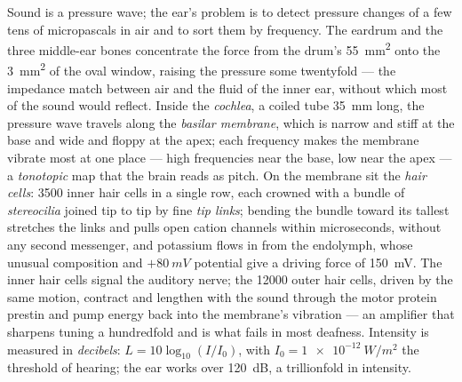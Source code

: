 \begin{definition}\label{def:b3:sensory-systems:cochlea}
Sound is a pressure wave; the ear's problem is to detect pressure
changes of a few tens of micropascals in air and to sort them by
frequency. The eardrum and the three middle-ear bones concentrate the
force from the drum's \qty{55}{mm^2} onto the \qty{3}{mm^2} of the oval
window, raising the pressure some twentyfold --- the impedance match
between air and the fluid of the inner ear, without which most of the
sound would reflect. Inside the \emph{cochlea}, a coiled tube
\qty{35}{mm} long, the pressure wave travels along the \emph{basilar
membrane}, which is narrow and stiff at the base and wide and floppy at
the apex; each frequency makes the membrane vibrate most at one place
--- high frequencies near the base, low near the apex --- a
\emph{tonotopic} map that the brain reads as pitch. On the membrane sit
the \emph{hair cells}: \num{3500} inner hair cells in a single row,
each crowned with a bundle of \emph{stereocilia} joined tip to tip by
fine \emph{tip links}; bending the bundle toward its tallest 
stretches the links and pulls open cation channels within microseconds,
without any second messenger, and potassium flows in from the
endolymph, whose unusual composition and $+\qty{80}{mV}$ potential give
a driving force of \qty{150}{mV}. The inner hair cells signal the
auditory nerve; the \num{12000} outer hair cells, driven by the same
motion, contract and lengthen with the sound through the motor protein
prestin and pump energy back into the membrane's vibration --- an
amplifier that sharpens tuning a hundredfold and is what fails in most
deafness. Intensity is measured in \emph{decibels}: $L = 10\log_{10}
(I/I_{0})$, with $I_{0} = \qty{1e-12}{W/m^2}$ the threshold of hearing;
the ear works over \qty{120}{dB}, a trillionfold in intensity.
\end{definition}

